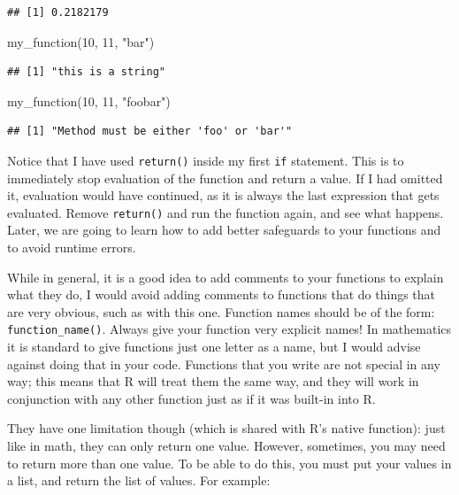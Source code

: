 \documentclass[
]{article}
\newenvironment{Shaded}{\begin{snugshade}}{\end{snugshade}}
\newcommand{\DecValTok}[1]{\textcolor[rgb]{0.00,0.00,0.81}{#1}}
\newcommand{\FunctionTok}[1]{\textcolor[rgb]{0.00,0.00,0.00}{#1}}
\newcommand{\NormalTok}[1]{#1}
\newcommand{\StringTok}[1]{\textcolor[rgb]{0.31,0.60,0.02}{#1}}
\begin{document}
\begin{verbatim}
## [1] 0.2182179
\end{verbatim}

\begin{Shaded}
\begin{Highlighting}[]
\FunctionTok{my\_function}\NormalTok{(}\DecValTok{10}\NormalTok{, }\DecValTok{11}\NormalTok{, }\StringTok{"bar"}\NormalTok{)}
\end{Highlighting}
\end{Shaded}

\begin{verbatim}
## [1] "this is a string"
\end{verbatim}

\begin{Shaded}
\begin{Highlighting}[]
\FunctionTok{my\_function}\NormalTok{(}\DecValTok{10}\NormalTok{, }\DecValTok{11}\NormalTok{, }\StringTok{"foobar"}\NormalTok{)}
\end{Highlighting}
\end{Shaded}

\begin{verbatim}
## [1] "Method must be either 'foo' or 'bar'"
\end{verbatim}

Notice that I have used \texttt{return()} inside my first \texttt{if} statement. This is to immediately stop
evaluation of the function and return a value. If I had omitted it, evaluation would have
continued, as it is always the last expression that gets evaluated. Remove \texttt{return()} and run the
function again, and see what happens. Later, we are going to learn how to add better safeguards to
your functions and to avoid runtime errors.

While in general, it is a good idea to add comments to your functions to explain what they do, I
would avoid adding comments to functions that do things that are very obvious, such as with this
one. Function names should be of the form: \texttt{function\_name()}. Always give your function very
explicit names! In mathematics it is standard to give functions just one letter as a name, but I
would advise against doing that in your code. Functions that you write are not special in any way;
this means that R will treat them the same way, and they will work in conjunction with any other
function just as if it was built-in into R.

They have one limitation though (which is shared with R's native function): just like in math,
they can only return one value. However, sometimes, you may need to return more than one value.
To be able to do this, you must put your values in a list, and return the list of values. For example:
\end{document}
